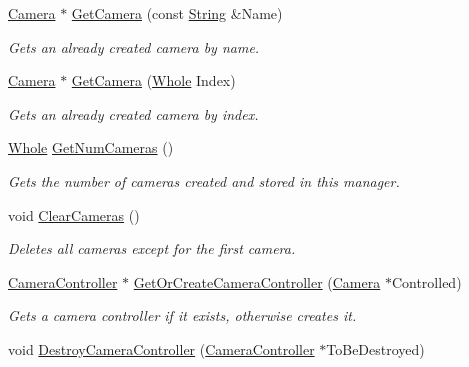 \begin{DoxyCompactItemize}
\hyperlink{classphys_1_1Camera}{Camera} $\ast$ \hyperlink{classphys_1_1CameraManager_ad247bd3789c579cba5edb4c00848ac7c}{GetCamera} (const \hyperlink{namespacephys_aa03900411993de7fbfec4789bc1d392e}{String} \&Name)
\begin{DoxyCompactList}\small\item\em Gets an already created camera by name. \item\end{DoxyCompactList}\item 
\hyperlink{classphys_1_1Camera}{Camera} $\ast$ \hyperlink{classphys_1_1CameraManager_a5147ab2269311bec15100953b7505d4b}{GetCamera} (\hyperlink{namespacephys_a460f6bc24c8dd347b05e0366ae34f34a}{Whole} Index)
\begin{DoxyCompactList}\small\item\em Gets an already created camera by index. \item\end{DoxyCompactList}\item 
\hyperlink{namespacephys_a460f6bc24c8dd347b05e0366ae34f34a}{Whole} \hyperlink{classphys_1_1CameraManager_a1a2111b4868bec403979b354395c4caf}{GetNumCameras} ()
\begin{DoxyCompactList}\small\item\em Gets the number of cameras created and stored in this manager. \item\end{DoxyCompactList}\item 
void \hyperlink{classphys_1_1CameraManager_a76bebee0820fcfa462412cb112b1b874}{ClearCameras} ()
\begin{DoxyCompactList}\small\item\em Deletes all cameras except for the first camera. \item\end{DoxyCompactList}\item 
\hyperlink{classphys_1_1CameraController}{CameraController} $\ast$ \hyperlink{classphys_1_1CameraManager_aaacbf12ce8ff0c8683f326c850166a6e}{GetOrCreateCameraController} (\hyperlink{classphys_1_1Camera}{Camera} $\ast$Controlled)
\begin{DoxyCompactList}\small\item\em Gets a camera controller if it exists, otherwise creates it. \item\end{DoxyCompactList}\item 
void \hyperlink{classphys_1_1CameraManager_ac600e8911f462476f79404b776db78a6}{DestroyCameraController} (\hyperlink{classphys_1_1CameraController}{CameraController} $\ast$ToBeDestroyed)

\end{DoxyCompactItemize}
